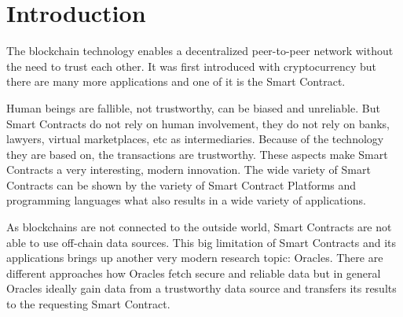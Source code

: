 \documentclass[conference]{IEEEtran}
\begin{document}




%
\IEEEpeerreviewmaketitle



\section{Introduction}

The blockchain technology enables a decentralized peer-to-peer network without the need to trust each other. It was first introduced with cryptocurrency but there are many more applications and one of it is the Smart Contract. \cite{Buterin2014} \par 
Human beings are fallible, not trustworthy, can be biased and unreliable. But Smart Contracts do not rely on human involvement, they do not rely on banks, lawyers, virtual marketplaces, etc as intermediaries. Because of the technology they are based on, the transactions are trustworthy. \cite{Mik2017} \cite{Meitinger2017} These aspects make Smart Contracts a very interesting, modern innovation. The wide variety of Smart Contracts can be shown by the variety of Smart Contract Platforms and programming languages what also results in a wide variety of applications. \par
As blockchains are not connected to the outside world, Smart Contracts are not able to use off-chain data sources. This big limitation of Smart Contracts and its applications brings up another very modern research topic: Oracles. \cite{Mik2017} There are different approaches how Oracles fetch secure and reliable data but in general Oracles ideally gain data from a trustworthy data source and transfers its results to the requesting Smart Contract. \cite{Ellis2017} 
\end{document}
